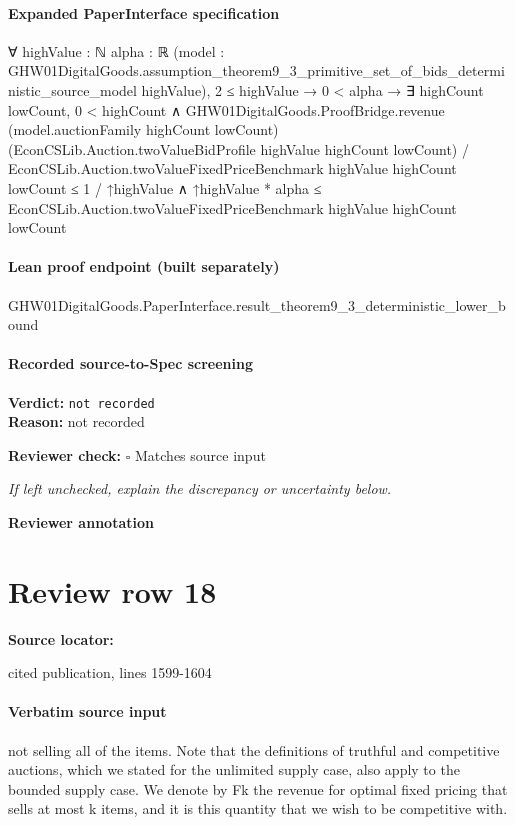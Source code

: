 \documentclass[10pt]{article}
\newcommand{\reviewerbox}{%
  \par\noindent\fbox{\parbox{0.96\linewidth}{\rule{0pt}{0.38in}}}\par
}
\newcommand{\reviewmatch}[1]{%
  \par\noindent\textbf{Reviewer check:} $\square$\; #1\par
  \noindent\emph{If left unchecked, explain the discrepancy or uncertainty below.}\par
}
\begin{document}
\paragraph{Expanded PaperInterface specification}
\begin{ReviewVerbatim}
∀ {highValue : ℕ} {alpha : ℝ}
  (model : GHW01DigitalGoods.assumption_theorem9_3_primitive_set_of_bids_deterministic_source_model highValue),
  2 ≤ highValue →
    0 < alpha →
      ∃ highCount lowCount,
        0 < highCount ∧
          GHW01DigitalGoods.ProofBridge.revenue (model.auctionFamily highCount lowCount)
                  (EconCSLib.Auction.twoValueBidProfile highValue highCount lowCount) /
                EconCSLib.Auction.twoValueFixedPriceBenchmark highValue highCount lowCount ≤
              1 / ↑highValue ∧
            ↑highValue * alpha ≤ EconCSLib.Auction.twoValueFixedPriceBenchmark highValue highCount lowCount
\end{ReviewVerbatim}

\paragraph{Lean proof endpoint (built separately)}\begin{ReviewVerbatim}
GHW01DigitalGoods.PaperInterface.result_theorem9_3_deterministic_lower_bound
\end{ReviewVerbatim}

\paragraph{Recorded source-to-Spec screening}
\textbf{Verdict:} \texttt{not recorded}
\\
\textbf{Reason:} not recorded
\reviewmatch{Matches source input}
\noindent\textbf{Reviewer annotation}\par
\reviewerbox
\clearpage
\hypertarget{source-claim-5c6c825e7e742c65}{}
\section*{Review row 18}
\textbf{Source locator:} {\footnotesize\raggedright cited publication, lines 1599-\allowbreak{}1604\par}
\paragraph{Verbatim source input}
\begin{ReviewVerbatim}
not selling all of the items. Note that the definitions of truthful and competitive auctions, which we
stated for the unlimited supply case, also apply to the
bounded supply case. We denote by Fk the revenue
for optimal fixed pricing that sells at most k items,
and it is this quantity that we wish to be competitive
with.
\end{ReviewVerbatim}
\end{document}
